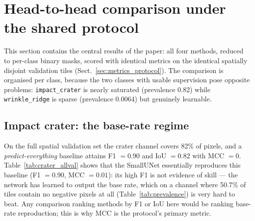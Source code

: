 \section{Head-to-head comparison under the shared protocol}
\label{sec:comparison}

This section contains the central results of the paper: all four methods, reduced to per-class binary masks, scored with identical metrics on the identical spatially disjoint validation tiles (Sect.~\ref{sec:metrics_protocol}). The comparison is organised per class, because the two classes with usable supervision pose opposite problems: \texttt{impact\_crater} is nearly saturated (prevalence 0.82) while \texttt{wrinkle\_ridge} is sparse (prevalence 0.0064) but genuinely learnable.

\subsection{Impact crater: the base-rate regime}
\label{sec:comp_crater}

On the full spatial validation set the crater channel covers 82\% of pixels, and a \emph{predict-everything} baseline attains F1 $=0.90$ and IoU $=0.82$ with MCC $=0$. Table~\ref{tab:crater_allval} shows that the SmallUNet essentially reproduces this baseline (F1 $=0.90$, MCC $=0.01$): its high F1 is not evidence of skill --- the network has learned to output the base rate, which on a channel where 50.7\% of tiles contain no negative pixels at all (Table~\ref{tab:prevalence}) is very hard to beat. Any comparison ranking methods by F1 or IoU here would be ranking base-rate reproduction; this is why MCC is the protocol's primary metric.

\begin{table}[htbp]
\centering
\caption{Impact crater, full spatial validation set (per-method calibrated threshold $\tau$). The predict-all row labels every pixel crater. MCC is the primary ranking metric; F1/IoU are dominated by the 0.82 base rate.}
\label{tab:crater_allval}
\end{table}

